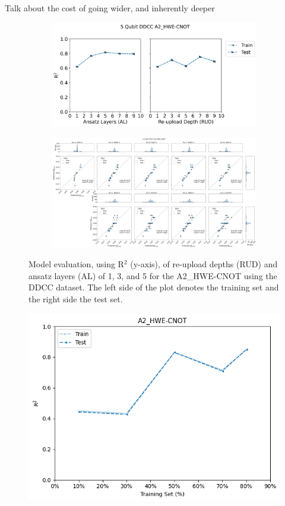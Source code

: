 \documentclass[journal=jacsat,manuscript=article]{achemso}
\begin{document}
Talk about the cost of going wider, and inherently deeper

\begin{figure}[H]
	\centering	
	\begin{subfigure}[b]{0.49\textwidth}
		\centering
		\includegraphics[width=\linewidth]{../images/DDCC/DDCC_RUDAL_lineplot}
		\caption{}
		\label{fig:ddccRUDAL_lineplot}
	\end{subfigure}
	\hfill
	\begin{subfigure}[b]{\textwidth}
		\centering
		\includegraphics[width=0.49\linewidth]{../images/DDCC/distribution_parity}
		\caption{}
		\label{fig:ddccdistribution_parity}
	\end{subfigure}
	\caption{Model evaluation, using R$^{2}$ (y-axis), of re-upload depths (RUD) and ansatz layers (AL) of 1, 3, and 5 for the A2\_HWE-CNOT using the DDCC dataset. The left side of the plot denotes the training set and the right side the test set.}
	\label{fig:ddcc_rud}	
\end{figure}




\begin{figure}[H]
	\centering
	\includegraphics[width=\linewidth]{../images/DDCC/DDCC_learning_curves}
	\caption{}
	\label{fig:ddcclearningcurves}
\end{figure}
\end{document}
